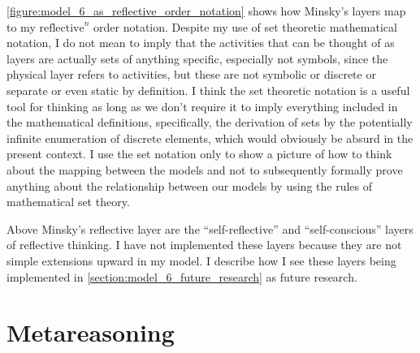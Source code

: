 \autoref{figure:model_6_as_reflective_order_notation} shows how
Minsky's layers map to my $\text{reflective}^n$ order notation.
Despite my use of set theoretic mathematical notation, I do not mean
to imply that the activities that can be thought of as layers are
actually sets of anything specific, especially not symbols, since the
physical layer refers to activities, but these are not symbolic or
discrete or separate or even static by definition.  I think the set
theoretic notation is a useful tool for thinking as long as we don't
require it to imply everything included in the mathematical
definitions, specifically, the derivation of sets by the potentially
infinite enumeration of discrete elements, which would obviously be
absurd in the present context.  I use the set notation only to show a
picture of how to think about the mapping between the models and not
to subsequently formally prove anything about the relationship between
our models by using the rules of mathematical set theory.

Above Minsky's reflective layer are the ``self-reflective'' and
``self-conscious'' layers of reflective thinking.  I have not
implemented these layers because they are not simple extensions upward
in my model.  I describe how I see these layers being implemented in
\autoref{section:model_6_future_research} as future research.

\section{Metareasoning}

